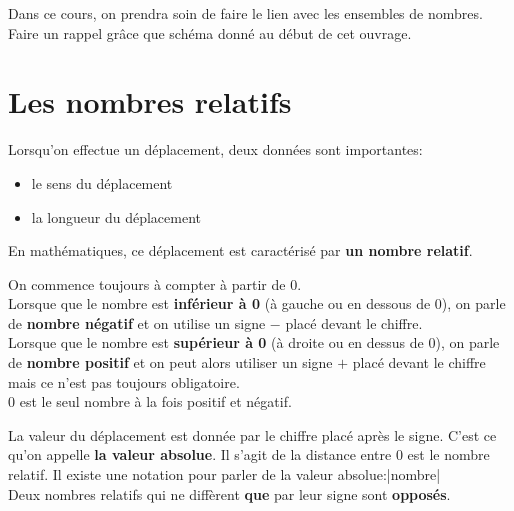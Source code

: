 \prof
Dans ce cours, on prendra soin de faire le lien avec les ensembles de nombres. Faire un rappel grâce que schéma donné au début de cet ouvrage.

\section{Les nombres relatifs}


\vspace{4em}

\begin{center}
    
\end{center}

\begin{definition}
Lorsqu'on effectue un déplacement, deux données sont importantes:
\begin{itemize}
    \item le sens du déplacement
    \item la longueur du déplacement
\end{itemize}

En mathématiques, ce déplacement est caractérisé par \textcolor{C2}{\textbf{un nombre relatif}}.\\
\end{definition}

\begin{definition}
On commence toujours à compter à partir de 0.\\
Lorsque que le nombre est \textbf{inférieur à 0} (à gauche ou en dessous de 0), on parle de \textcolor{C2}{\textbf{nombre négatif}} et on utilise un signe $-$ placé devant le chiffre.\\
Lorsque que le nombre est \textbf{supérieur à 0} (à droite ou en dessus de 0), on parle de \textcolor{C2}{\textbf{nombre positif}} et on peut alors utiliser un signe $+$ placé devant le chiffre mais ce n'est pas toujours obligatoire.\\
0 est le seul nombre à la fois positif et négatif.\\
\end{definition}



\begin{definition}
La valeur du déplacement est donnée par le chiffre placé après le signe. C'est ce qu'on appelle \textcolor{C2}{\textbf{ la valeur absolue}}.
Il s'agit de la distance entre 0 est le nombre relatif. Il existe une notation pour parler de la valeur absolue:|nombre|\\
Deux nombres relatifs qui ne diffèrent \textbf{que} par leur signe sont \textcolor{C2}{\textbf{opposés}}.
\end{definition}

